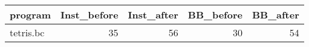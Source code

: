\begin{tabular}{lrrrr}
\hline
 program   &   Inst\_before &   Inst\_after &   BB\_before &   BB\_after \\
\hline
 tetris.bc &            35 &           56 &          30 &         54 \\
\hline
\end{tabular}